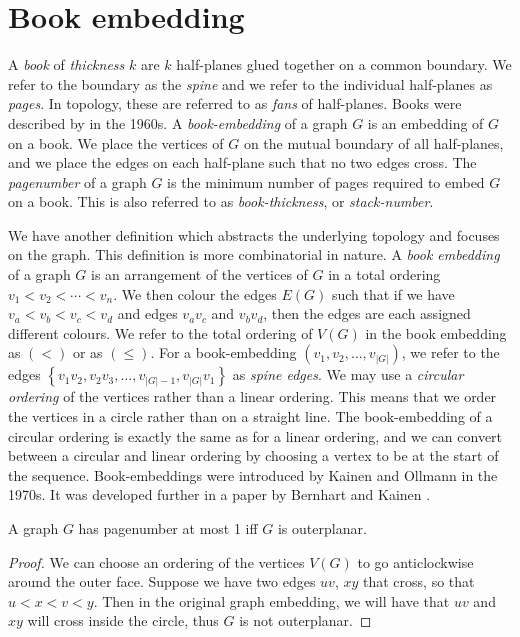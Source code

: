 \section{Book embedding}\label{sec:Book Embedding}
A \textit{book} of \textit{thickness} \(k\) are \(k\) half-planes glued together on a common boundary. We refer to the boundary as the \textit{spine} and we refer to the individual half-planes as \textit{pages}. In topology, these are referred to as \textit{fans} of half-planes. Books were described by \textcite{persingerSubsetsNbooksE31966,atneosengailadeleEmbeddabilityCompactaNbooks} in the 1960s.
A \textit{book-embedding} of a graph \(G\) is an embedding of \(G\) on a book. We place the vertices of \(G\) on the mutual boundary of all half-planes, and we place the edges on each half-plane such that no two edges cross.
The \textit{pagenumber} of a graph \(G\) is the minimum number of pages required to embed \(G\) on a book. This is also referred to as \textit{book-thickness}, or \textit{stack-number}.
\par
We have another definition which abstracts the underlying topology and focuses on the graph. This definition is more combinatorial in nature.
A \textit{book embedding} of a graph \(G\) is an arrangement of the vertices of \(G\) in a total ordering \(v_1 < v_2 < \cdots < v_n\). We then colour the edges \(E(G)\) such that if we have \(v_a < v_b < v_c < v_d\) and edges \(v_a v_c\) and \(v_b v_d\), then the edges are each assigned different colours.
We refer to the total ordering of \(V(G)\) in the book embedding as \((<)\) or as \((\leq)\). For a book-embedding \((v_1, v_2, \ldots, v_{|G|})\), we refer to the edges \( \left\{ v_1 v_2, v_2 v_3, \ldots, v_{|G| - 1}, v_{|G|}v_{1} \right\} \) as \textit{spine edges}.
We may use a \textit{circular ordering} of the vertices rather than a linear ordering. This means that we order the vertices in a circle rather than on a straight line. The book-embedding of a circular ordering is exactly the same as for a linear ordering, and we can convert between a circular and linear ordering by choosing a vertex to be at the start of the sequence.
Book-embeddings were introduced by Kainen and Ollmann in the 1970s.\cite{kainenRecentResultsTopological1974, ollmannBookThicknessVarious1973} It was developed further in a paper by Bernhart and Kainen \cite{bernhartBookThicknessGraph1979}.
\begin{lemma}\label{lem:Pagenumber_1}
	A graph \(G\) has pagenumber at most 1 iff \(G\) is outerplanar.
\end{lemma}
\begin{proof}
	We can choose an ordering of the vertices \(V(G)\) to go anticlockwise around the outer face. Suppose we have two edges \(uv\), \(xy\) that cross, so that \(u < x < v < y\). Then in the original graph embedding, we will have that \(uv\) and \(xy\) will cross inside the circle, thus \(G\) is not outerplanar.
\end{proof}
